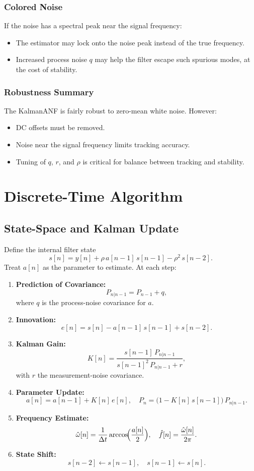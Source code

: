 \documentclass{article}
\begin{document}
\subsubsection*{Colored Noise}
If the noise has a spectral peak near the signal frequency:
\begin{itemize}
    \item The estimator may lock onto the noise peak instead of the true frequency.
    \item Increased process noise \(q\) may help the filter escape such spurious modes, at the cost of stability.
\end{itemize}

\subsubsection*{Robustness Summary}
The KalmanANF is fairly robust to zero-mean white noise. However:
\begin{itemize}
    \item DC offsets must be removed.
    \item Noise near the signal frequency limits tracking accuracy.
    \item Tuning of \(q\), \(r\), and \(\rho\) is critical for balance between tracking and stability.
\end{itemize}

\section{Discrete-Time Algorithm}

\subsection{State-Space and Kalman Update}
Define the internal filter state
\[
s[n] = y[n] + \rho\,a[n-1]\,s[n-1] - \rho^2\,s[n-2].
\]
Treat \(a[n]\) as the parameter to estimate.  At each step:

\begin{enumerate}
  \item \textbf{Prediction of Covariance:}
    \[
      P_{n|n-1} = P_{n-1} + q,
    \]
    where \(q\) is the process-noise covariance for \(a\).
  \item \textbf{Innovation:}
    \[
      e[n] = s[n] - a[n-1]\,s[n-1] + s[n-2].
    \]
  \item \textbf{Kalman Gain:}
    \[
      K[n] = \frac{s[n-1]\,P_{n|n-1}}{s[n-1]^2\,P_{n|n-1} + r},
    \]
    with \(r\) the measurement-noise covariance.
  \item \textbf{Parameter Update:}
    \[
      a[n] = a[n-1] + K[n]\,e[n],
      \quad
      P_n = \bigl(1 - K[n]\,s[n-1]\bigr)\,P_{n|n-1}.
    \]
  \item \textbf{Frequency Estimate:}
    \[
      \hat\omega[n]
      = \frac{1}{\Delta t}\arccos\!\Bigl(\frac{a[n]}{2}\Bigr),
      \quad
      \hat f[n] = \frac{\hat\omega[n]}{2\pi}.
    \]
  \item \textbf{State Shift:}
    \[
      s[n-2]\gets s[n-1], 
      \quad 
      s[n-1]\gets s[n].
    \]
\end{enumerate}
\end{document}
